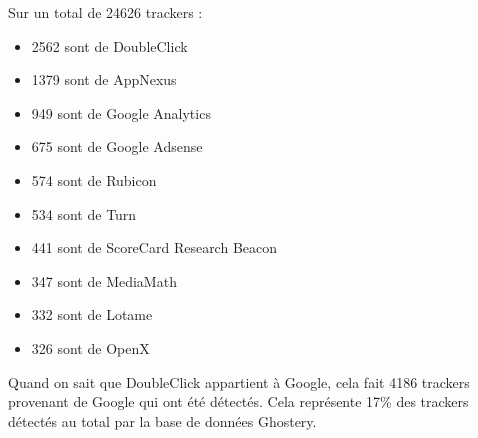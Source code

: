 Sur un total de 24626 trackers :
\begin{itemize}
  \item 2562 sont de DoubleClick
  \item 1379 sont de AppNexus
  \item 949 sont de Google Analytics
  \item 675 sont de Google Adsense
  \item 574 sont de Rubicon
  \item 534 sont de Turn
  \item 441 sont de ScoreCard Research Beacon
  \item 347 sont de MediaMath
  \item 332 sont de Lotame
  \item 326 sont de OpenX
  \newline
\end{itemize}

Quand on sait que DoubleClick appartient à Google, cela fait 4186 trackers provenant de Google qui ont été détectés. Cela représente 17\% des trackers détectés au total par la base de données Ghostery.
